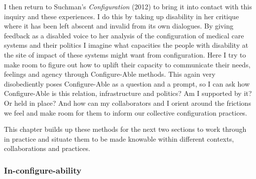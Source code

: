 I then return to Suchman's \emph{Configuration} (2012) to bring it into
contact with this inquiry and these experiences. I do this by taking up
disability in her critique where it has been left abscent and invalid
from its own dialogues. By giving feedback as a disabled voice to her
analysis of the configuration of medical care systems and their politics
I imagine what capacities the people with disability at the site of
impact of these systems might want from configuration. Here I try to
make room to figure out how to uplift their capacity to communicate
their needs, feelings and agency through Configure-Able methods. This
again very disobediently poses Configure-Able as a question and a
prompt, so I can ask how Configure-Able is this relation, infrastructure
and politics? Am I supported by it? Or held in place? And how can my
collaborators and I orient around the frictions we feel and make room
for them to inform our collective configuration practices.

This chapter builds up these methods for the next two sections to work
through in practice and situate them to be made knowable within
different contexts, collaborations and practices.

\hypertarget{in-configure-ability}{%
\subsubsection[In-configure-ability]{\texorpdfstring{\protect\hypertarget{anchor}{}{}In-configure-ability}{In-configure-ability}}\label{in-configure-ability}}

